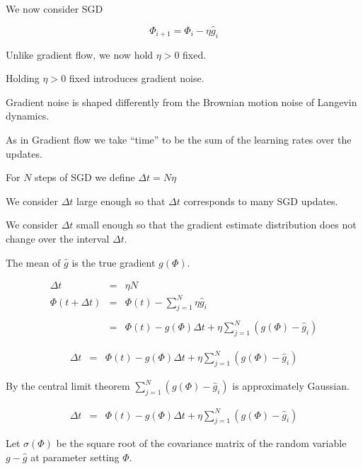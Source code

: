 {

\vfill
We now consider SGD

$$\Phi_{i+1} = \Phi_i - \eta\hat{g}_i$$

\vfill
Unlike gradient flow, we now hold $\eta > 0$ fixed.

\vfill
Holding $\eta > 0$ fixed introduces gradient noise.

\vfill
Gradient noise is shaped differently from the Brownian motion noise of Langevin dynamics.


\vfill
As in Gradient flow we take ``time'' to be the sum of the learning rates over the updates.

\vfill
For $N$ steps of SGD we define $\Delta t = N \eta$

\vfill
We consider $\Delta t$ large enough so that $\Delta t$ corresponds to many SGD updates.

\vfill
We consider $\Delta t$ small enough so that the gradient estimate distribution does not change over the interval $\Delta t$.


The mean of $\hat{g}$ is the true gradient $g(\Phi)$.  

\begin{eqnarray*}
\Delta t & = & \eta N \\
\Phi(t + \Delta t) &  = & \Phi(t) - \sum_{j=1}^N \eta\hat{g}_i \\
\\
 &  = & \Phi(t) -g(\Phi)\Delta t + \eta \sum_{j=1}^N (g(\Phi) - \hat{g}_i)
\end{eqnarray*}

\begin{eqnarray*}
\Delta t & = &  \Phi(t) -g(\Phi)\Delta t + \eta \sum_{j=1}^N (g(\Phi) - \hat{g}_i)
\end{eqnarray*}


\vfill
By the central limit theorem $\sum_{j=1}^N (g(\Phi) - \hat{g}_i)$ is approximately Gaussian.


{\huge
\begin{eqnarray*}
\Delta t & = &  \Phi(t) -g(\Phi)\Delta t + \eta \sum_{j=1}^N (g(\Phi) - \hat{g}_i)
\end{eqnarray*}

\vfill
Let $\sigma(\Phi)$ be the square root of the covariance matrix of the random variable $g-\hat{g}$ at parameter setting $\Phi$.

}}
